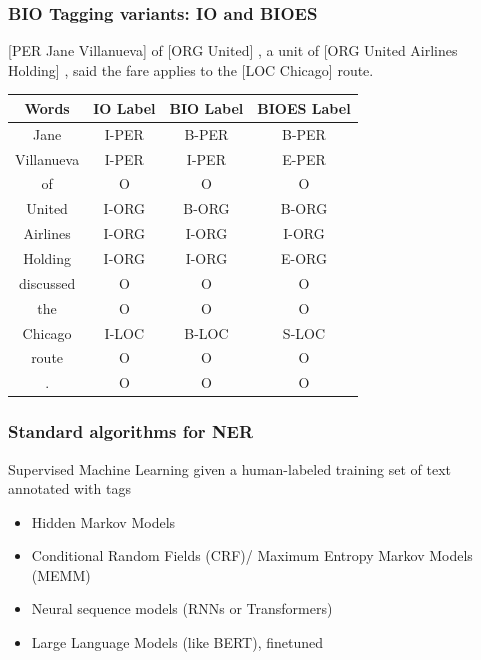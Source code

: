 \documentclass[13.5pt,aspecratio=169]{beamer}
\begin{document}
    \begin{frame}
    \onehalfspacing
    
        \frametitle{BIO Tagging variants: IO and BIOES}	
        \color{blue}[PER Jane Villanueva] \color{black}of \color{blue}[ORG United]\color{black} , a unit of \color{blue}[ORG United Airlines Holding]\color{black} , said the fare applies to the \color{blue}[LOC Chicago]\color{black} route. 
    \begin{center}
    \renewcommand{\arraystretch}{0.83} %
        \begin{tabular}{ |c|c|c|c| } 
        \hline
        \large Words &  \large IO Label & \large BIO Label & \large BIOES Label \\
        \hline \small
        Jane & \small I-PER &\small  B-PER &\small  B-PER \\  \small
        Villanueva & \small I-PER &\small  I-PER &\textbf{} E-PER \\  \small
        of & \small O &\small  O &\small  O\\  \small
        United & \small I-ORG &\small  B-ORG &\small  B-ORG \\  \small
        Airlines & \small I-ORG & I\small -ORG &\small  I-ORG \\  \small
        Holding & \small I-ORG &\small  I-ORG &\small  E-ORG \\  \small
        discussed & \small O &\small  O &\small  O\\  \small
        the & \small O &\small  O &\small  O\\  \small
        Chicago & \small I-LOC &\small  B-LOC &\small  S-LOC \\  \small
        route & \small O &\small  O &\small  O\\  \small
        . & \small O & \small O & \small O \\
    \hline
    \end{tabular}
    \end{center}
    \end{frame}
    \begin{frame}
    \onehalfspacing
    
        \frametitle{Standard algorithms for NER}	
        \begin{block}{}
         \large   Supervised Machine Learning given a human-labeled training set of text annotated with tags
        \begin{itemize}
            \item Hidden Markov Models
            \item Conditional Random Fields (CRF)/ Maximum Entropy Markov Models (MEMM)
            \item Neural sequence models (RNNs or Transformers)
            \item Large Language Models (like BERT), finetuned
        \end{itemize}
        \end{block}
    \end{frame}
\end{document}
